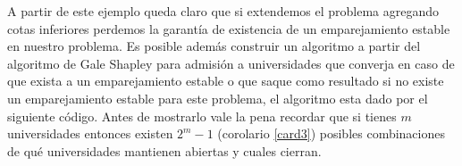 A partir de este ejemplo queda claro que si extendemos el problema agregando cotas inferiores perdemos la garantía de existencia de un emparejamiento estable en nuestro problema. Es posible además construir un algoritmo a partir del algoritmo de Gale Shapley para admisión a universidades que converja en caso de que exista a un emparejamiento estable o que saque como resultado si no existe un emparejamiento estable para este problema, el algoritmo esta dado por el siguiente código. Antes de mostrarlo vale la pena recordar que si tienes $m$ universidades entonces existen $2^{m}-1$ (corolario \ref{card3}) posibles combinaciones de qué universidades mantienen abiertas y cuales cierran. 
\vspace{1 cm}

